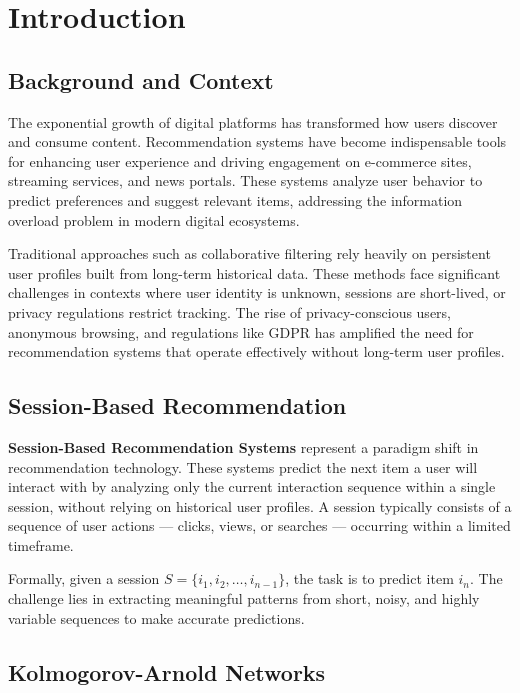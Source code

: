 \documentclass[12pt,a4paper]{report}
\begin{document}
\chapter{Introduction}

\section{Background and Context}

The exponential growth of digital platforms has transformed how users discover
and consume content. Recommendation systems have become indispensable tools for
enhancing user experience and driving engagement on e-commerce sites, streaming
services, and news portals. These systems analyze user behavior to predict
preferences and suggest relevant items, addressing the information overload
problem in modern digital ecosystems.

Traditional approaches such as collaborative filtering rely heavily on persistent
user profiles built from long-term historical data. These methods face significant
challenges in contexts where user identity is unknown, sessions are short-lived,
or privacy regulations restrict tracking. The rise of privacy-conscious users,
anonymous browsing, and regulations like GDPR has amplified the need for
recommendation systems that operate effectively without long-term user profiles.

\section{Session-Based Recommendation}

\textbf{Session-Based Recommendation Systems} represent a paradigm shift in
recommendation technology. These systems predict the next item a user will
interact with by analyzing only the current interaction sequence within a single
session, without relying on historical user profiles. A session typically consists
of a sequence of user actions --- clicks, views, or searches --- occurring within
a limited timeframe.

Formally, given a session $S = \{i_1, i_2, \ldots, i_{n-1}\}$, the task is to
predict item $i_n$. The challenge lies in extracting meaningful patterns from
short, noisy, and highly variable sequences to make accurate predictions.

\section{Kolmogorov-Arnold Networks}
\end{document}
